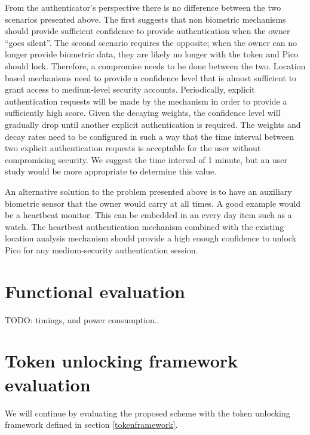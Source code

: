 From the authenticator's perspective there is no difference between the two scenarios presented above. The first suggests that non biometric mechanisms should provide sufficient confidence to provide authentication when the owner ``goes silent''. The second scenario requires the opposite; when the owner can no longer provide biometric data, they are likely no longer with the token and Pico should lock. Therefore, a compromise needs to be done between the two. Location based mechanisms need to provide a confidence level that is almost sufficient to grant access to medium-level security accounts. Periodically, explicit authentication requests will be made by the mechanism in order to provide a sufficiently high score. Given the decaying weights, the confidence level will gradually drop until another explicit authentication is required. The weights and decay rates need to be configured in such a way that the time interval between two explicit authentication requests is acceptable for the user without compromising security. We suggest the time interval of 1 minute, but an user study would be more appropriate to determine this value.

An alternative solution to the problem presented above is to have an auxiliary biometric sensor that the owner would carry at all times. A good example would be a heartbeat monitor. This can be embedded in an every day item such as a watch. The heartbeat authentication mechanism combined with the existing location analysis mechanism should provide a high enough confidence to unlock Pico for any medium-security authentication session.

\section{Functional evaluation}
\label{functionaleval}
TODO: timings, and power consumption..

\section{Token unlocking framework evaluation}
We will continue by evaluating the proposed scheme with the token unlocking framework defined in section \ref{tokenframework}. 

